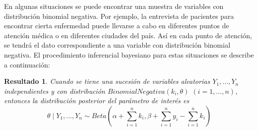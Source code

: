 \documentclass[
  10pt,
  spanish,
]{book}
\newtheorem{proposition}{Resultado}[chapter]
\theoremstyle{definition}
\theoremstyle{definition}
\theoremstyle{definition}
\theoremstyle{definition}
\theoremstyle{remark}
\begin{document}
En algunas situaciones se puede encontrar una muestra de variables con distribución binomial negativa. Por ejemplo, la entrevista de pacientes para encontrar cierta enfermedad puede llevarse a cabo en diferentes puntos de atención médica o en diferentes ciudades del país. Así en cada punto de atención, se tendrá el dato correspondiente a una variable con distribución binomial negativa. El procedimiento inferencial bayesiano para estas situaciones se describe a continuación:

\begin{proposition}
\protect\hypertarget{prp:unnamed-chunk-33}{}{\label{prp:unnamed-chunk-33} }Cuando se tiene una sucesión de variables aleatorias \(Y_1,\ldots, Y_n\) independientes y con distribución \(BinomialNegativa(k_i,\theta)\) \((i=1,\ldots,n)\), entonces la distribución posterior del parámetro de interés es
\begin{equation}
\theta \mid Y_1,\ldots, Y_n \sim Beta(\alpha+\sum_{i=1}^n k_i,\beta+\sum_{i=1}^n y_i-\sum_{i=1}^n k_i)
\end{equation}
\end{proposition}
\end{document}
